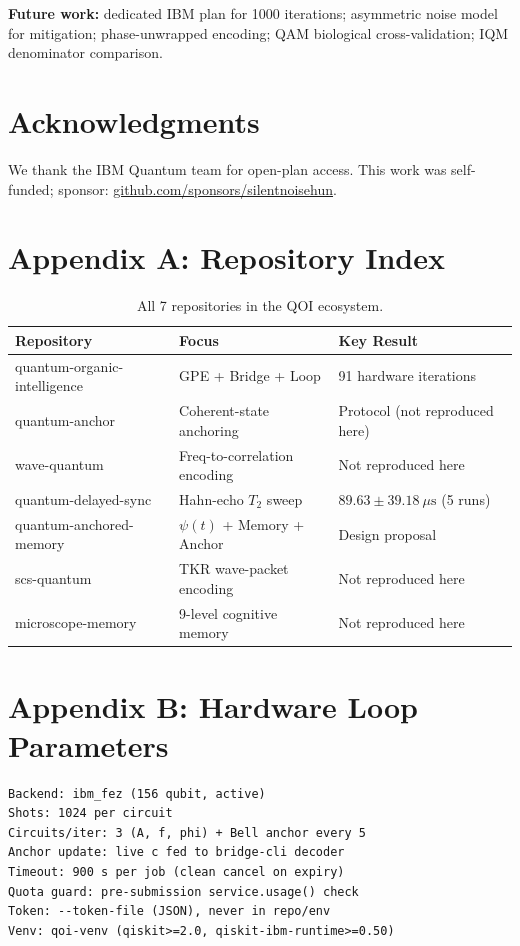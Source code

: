 \documentclass[sigconf,anonymous=false]{acmart}
\begin{document}
\textbf{Future work:} dedicated IBM plan for 1000 iterations; asymmetric noise model for mitigation; phase-unwrapped encoding; QAM biological cross-validation; IQM denominator comparison.

\section*{Acknowledgments}

We thank the IBM Quantum team for open-plan access. This work was self-funded; sponsor: \url{github.com/sponsors/silentnoisehun}.




\appendix

\section{Appendix A: Repository Index}

\begin{table}[h]
\centering
\caption{All 7 repositories in the QOI ecosystem.}
\label{tab:repos}
\begin{tabular}{lll}
\toprule
Repository & Focus & Key Result \\
\midrule
quantum-organic-intelligence & GPE + Bridge + Loop & 91 hardware iterations \\
quantum-anchor & Coherent-state anchoring & Protocol (not reproduced here) \\
wave-quantum & Freq-to-correlation encoding & Not reproduced here \\
quantum-delayed-sync & Hahn-echo $T_2$ sweep & $89.63 \pm 39.18\ \mu\text{s}$ (5 runs) \\
quantum-anchored-memory & $\psi(t)$ + Memory + Anchor & Design proposal \\
scs-quantum & TKR wave-packet encoding & Not reproduced here \\
microscope-memory & 9-level cognitive memory & Not reproduced here \\
\bottomrule
\end{tabular}
\end{table}

\section{Appendix B: Hardware Loop Parameters}

\begin{verbatim}
Backend: ibm_fez (156 qubit, active)
Shots: 1024 per circuit
Circuits/iter: 3 (A, f, phi) + Bell anchor every 5
Anchor update: live c fed to bridge-cli decoder
Timeout: 900 s per job (clean cancel on expiry)
Quota guard: pre-submission service.usage() check
Token: --token-file (JSON), never in repo/env
Venv: qoi-venv (qiskit>=2.0, qiskit-ibm-runtime>=0.50)
\end{verbatim}
\end{document}
